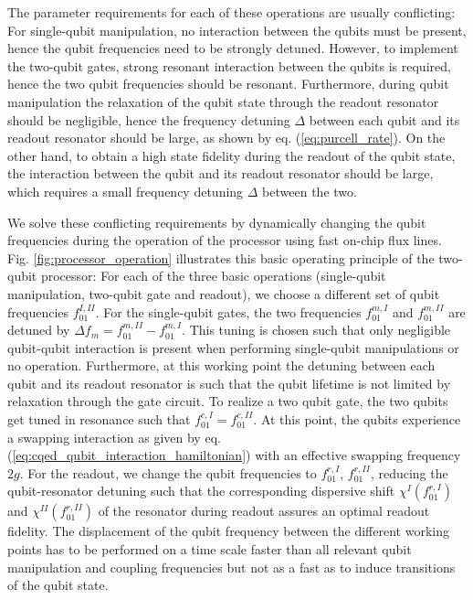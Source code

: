 The parameter requirements for each of these operations are usually conflicting: For single-qubit manipulation, no interaction between the qubits must be present, hence the qubit frequencies need to be strongly detuned. However, to implement the two-qubit gates, strong resonant interaction between the qubits is required, hence the two qubit frequencies should be resonant. Furthermore, during qubit manipulation the relaxation of the qubit state through the readout resonator should be negligible, hence the frequency detuning $\Delta$ between each qubit and its readout resonator should be large, as shown by eq. (\ref{eq:purcell_rate}). On the other hand, to obtain a high state fidelity during the readout of the qubit state, the interaction between the qubit and its readout resonator should be large, which requires a small frequency detuning $\Delta$ between the two.

\smallskip

We solve these conflicting requirements by dynamically changing the qubit frequencies during the operation of the processor using fast on-chip flux lines. Fig. \ref{fig:processor_operation} illustrates this basic operating principle of the two-qubit processor: For each of the three basic operations (single-qubit manipulation, two-qubit gate and readout), we choose a different set of qubit frequencies $f_{01}^{I,II}$. For the single-qubit gates, the two frequencies $f_{01}^{m,I}$ and $f_{01}^{m,II}$ are detuned by $\Delta f_m = f_{01}^{m,II}-f_{01}^{m,I}$. This tuning is chosen such that only negligible qubit-qubit interaction is present when performing single-qubit manipulations or no operation. Furthermore, at this working point the detuning between each qubit and its readout resonator is such that the qubit lifetime is not limited by relaxation through the gate circuit. To realize a two qubit gate, the two qubits get tuned in resonance such that $f_{01}^{c,I} = f_{01}^{c,II}$. At this point, the qubits experience a swapping interaction as given by eq. (\ref{eq:cqed_qubit_interaction_hamiltonian}) with an effective swapping frequency $2g$. For the readout, we change the qubit frequencies to $f_{01}^{r,I}$, $f_{01}^{r,II}$, reducing the qubit-resonator detuning such that the corresponding dispersive shift $\chi^I(f_{01}^{r,I})$ and $\chi^{II}(f_{01}^{r,II})$ of the resonator during readout assures an optimal readout fidelity. The displacement of the qubit frequency between the different working points has to be performed on a time scale faster than all relevant qubit manipulation and coupling frequencies but not as a fast as to induce transitions of the qubit state.

